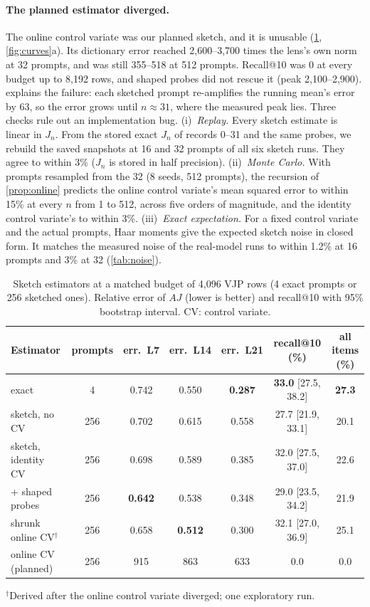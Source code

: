 \documentclass[11pt]{article}
\theoremstyle{definition}
\begin{document}
\paragraph{The planned estimator diverged.} The online control variate was our planned sketch, and
it is unusable (\cref{tab:sketch}, \cref{fig:curves}a). Its dictionary error reached 2,600--3,700 times
the lens's own norm at 32 prompts, and was still 355--518 at 512 prompts. Recall@10 was 0 at every
budget up to 8,192 rows, and shaped probes did not rescue it (peak 2,100--2,900).
 explains the failure: each sketched prompt re-amplifies the running mean's error by
63, so the error grows until $n\approx31$, where the measured peak lies. Three checks rule out an
implementation bug.
(i)~\emph{Replay.} Every sketch estimate is linear in $J_n$. From the stored exact $J_n$ of records
0--31 and the same probes, we rebuild the saved snapshots at 16 and 32 prompts of all six sketch runs.
They agree to within 3\% ($J_n$ is stored in half precision).
(ii)~\emph{Monte Carlo.} With prompts resampled from the 32 (8 seeds, 512 prompts), the recursion of
\cref{prop:online} predicts the online control variate's mean squared error to within 15\% at every
$n$ from 1 to 512, across five orders of magnitude, and the identity control variate's to within 3\%.
(iii)~\emph{Exact expectation.} For a fixed control variate and the actual prompts, Haar moments give
the expected sketch noise in closed form. It matches the measured noise of the real-model runs to
within 1.2\% at 16 prompts and 3\% at 32 (\cref{tab:noise}).

\begin{table}[t]
\centering
\caption{Sketch estimators at a matched budget of 4,096 VJP rows (4 exact prompts or 256 sketched
ones). Relative error of $AJ$ (lower is better) and recall@10 with 95\% bootstrap interval. CV:
control variate.}
\label{tab:sketch}
\small
\setlength{\tabcolsep}{3.6pt}
\begin{tabular}{lcccccc}
\toprule
Estimator & prompts & err.\ L7 & err.\ L14 & err.\ L21 & recall@10 (\%) & all items (\%) \\
\midrule
exact & 4 & 0.742 & 0.550 & \textbf{0.287} & \textbf{33.0} [27.5, 38.2] & \textbf{27.3} \\
sketch, no CV & 256 & 0.702 & 0.615 & 0.558 & 27.7 [21.9, 33.1] & 20.1 \\
sketch, identity CV & 256 & 0.698 & 0.589 & 0.385 & 32.0 [27.5, 37.0] & 22.6 \\
\quad + shaped probes & 256 & \textbf{0.642} & 0.538 & 0.348 & 29.0 [23.5, 34.2] & 21.9 \\
shrunk online CV$^\dagger$ & 256 & 0.658 & \textbf{0.512} & 0.300 & 32.1 [27.0, 36.9] & 25.1 \\
online CV (planned) & 256 & 915 & 863 & 633 & 0.0 & 0.0 \\
\bottomrule
\end{tabular}

\smallskip
\raggedright\footnotesize $^\dagger$Derived after the online control variate diverged; one exploratory run.
\end{table}
\end{document}
